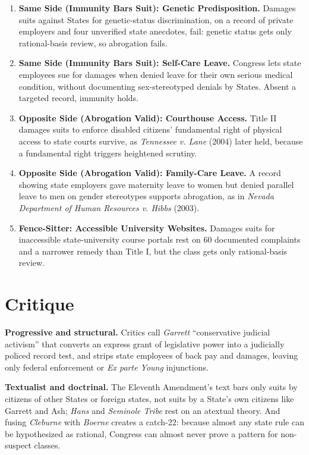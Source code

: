 \documentclass[12pt]{article}
\begin{document}
\begin{enumerate}
\item \textbf{Same Side (Immunity Bars Suit): Genetic Predisposition.} Damages suits against States for genetic-status discrimination, on a record of private employers and four unverified state anecdotes, fail: genetic status gets only rational-basis review, so abrogation fails.
\item \textbf{Same Side (Immunity Bars Suit): Self-Care Leave.} Congress lets state employees sue for damages when denied leave for their own serious medical condition, without documenting sex-stereotyped denials by States. Absent a targeted record, immunity holds.
\item \textbf{Opposite Side (Abrogation Valid): Courthouse Access.} Title II damages suits to enforce disabled citizens' fundamental right of physical access to state courts survive, as \textit{Tennessee v. Lane} (2004) later held, because a fundamental right triggers heightened scrutiny.
\item \textbf{Opposite Side (Abrogation Valid): Family-Care Leave.} A record showing state employers gave maternity leave to women but denied parallel leave to men on gender stereotypes supports abrogation, as in \textit{Nevada Department of Human Resources v. Hibbs} (2003).
\item \textbf{Fence-Sitter: Accessible University Websites.} Damages suits for inaccessible state-university course portals rest on 60 documented complaints and a narrower remedy than Title I, but the class gets only rational-basis review.
\end{enumerate}

\section{Critique}

\textbf{Progressive and structural.} Critics call \textit{Garrett} ``conservative judicial activism'' that converts an express grant of legislative power into a judicially policed record test, and strips state employees of back pay and damages, leaving only federal enforcement or \textit{Ex parte Young} injunctions.

\textbf{Textualist and doctrinal.} The Eleventh Amendment's text bars only suits by citizens of other States or foreign states, not suits by a State's own citizens like Garrett and Ash; \textit{Hans} and \textit{Seminole Tribe} rest on an atextual theory. And fusing \textit{Cleburne} with \textit{Boerne} creates a catch-22: because almost any state rule can be hypothesized as rational, Congress can almost never prove a pattern for non-suspect classes.
\end{document}
